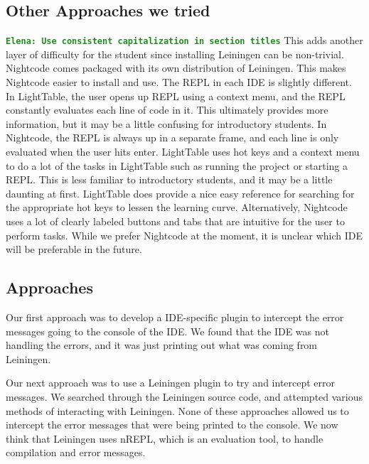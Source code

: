 \documentclass[12pt]{article}
\newcommand{\comment}[1]{{\bf \tt  {#1}}}
\newcommand{\emcomment}[1]{\textcolor{ForestGreen}{\comment{Elena: {#1}}}}
\newcommand{\mmcomment}[1]{\textcolor{magenta}{\comment{Max: {#1}}}}
\begin{document}
\subsection{Other Approaches we tried}
\emcomment{Use consistent capitalization in section titles}
This adds another layer of difficulty for the student since installing Leiningen can be non-trivial. Nightcode comes packaged with its own distribution of Leiningen. This makes Nightcode easier to install and use. The REPL in each IDE is slightly different. In LightTable, the user opens up REPL
using a context menu, and the REPL constantly evaluates each line of code in it. This ultimately provides more information, but it may be a little confusing for introductory students. In Nightcode, the REPL is always up in a
separate frame, and each line is only evaluated when the user hits enter. LightTable uses hot keys and a context menu to do a lot of the tasks in LightTable such as running the project or starting a REPL. This is less
familiar to introductory students, and it may be a little daunting at first. LightTable does provide a nice easy reference for searching for the appropriate hot keys to lessen the learning curve. Alternatively, Nightcode uses a lot of clearly labeled buttons and tabs that are intuitive for the user
to perform tasks. While we prefer Nightcode at the moment, it is unclear which IDE will be preferable in the future.

\subsection{Approaches}\label{sec:approach}
Our first approach was to develop a IDE-specific plugin to intercept the error messages going to the console of the IDE. We found that the IDE was not handling the errors, and it was just printing out what was coming from Leiningen.

Our next approach was to use a Leiningen plugin to try and intercept error messages. We searched through the Leiningen source code, and attempted various methods of interacting with Leiningen. None of these approaches allowed us to intercept the error messages that were being printed to the console. We now think that Leiningen uses nREPL, which is an evaluation tool, to handle compilation and error messages.
\end{document}
